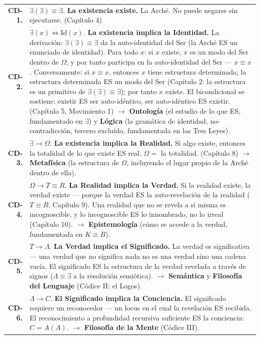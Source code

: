 \documentclass[10pt, openany, oneside]{book}
\renewcommand{\footnotesize}{\fontsize{8.5}{11}\selectfont}
\begin{document}
{\footnotesize
\noindent\begin{tabular}{r p{}}
\textbf{CD-1.} & $\exists(\exists) \equiv \exists$. \textbf{La existencia existe.} La Arch\={e}. No puede negarse sin ejecutarse. (Capítulo 4) \\[0.3em]
\textbf{CD-2.} & $\exists(x) \iff \text{Id}(x)$. \textbf{La existencia implica la Identidad.} La derivación: $\exists(\exists) \equiv \exists$ da la auto-identidad del Ser (la Arch\={e} ES un enunciado de identidad). Para todo $x$: si $x$ existe, $x$ es un modo del Ser dentro de $\Omega$, y por tanto participa en la auto-identidad del Ser --- $x \equiv x$. Conversamente: si $x \equiv x$, entonces $x$ tiene estructura determinada; la estructura determinada ES un modo del Ser (Capítulo 2: la estructura es un primitivo de $\exists(\exists) \equiv \exists$); por tanto $x$ existe. El bicondicional se sostiene: existir ES ser auto-idéntico, ser auto-idéntico ES existir. (Capítulo 5, Movimiento 1) $\to$ \textbf{Ontología} (el estudio de lo que ES, fundamentado en $\exists$) y \textbf{Lógica} (la gramática de identidad, no-contradicción, tercero excluido, fundamentada en las Tres Leyes). \\[0.3em]
\textbf{CD-3.} & $\exists \to \Omega$. \textbf{La existencia implica la Realidad.} Si algo existe, entonces la totalidad de lo que existe ES real. $\Omega = $ la totalidad. (Capítulo 8) $\to$ \textbf{Metafísica} (la estructura de $\Omega$, incluyendo el lugar propio de la Arch\={e} dentro de ella). \\[0.3em]
\textbf{CD-4.} & $\Omega \to T \equiv R$. \textbf{La Realidad implica la Verdad.} Si la realidad existe, la verdad existe --- porque la verdad ES la auto-revelación de la realidad ($T \equiv R$, Capítulo 9). Una realidad que no se revela a sí misma es incognoscible, y lo incognoscible ES lo innombrado, no lo irreal (Capítulo 10). $\to$ \textbf{Epistemología} (cómo se accede a la verdad, fundamentada en $K \equiv B$). \\[0.3em]
\textbf{CD-5.} & $T \to \Lambda$. \textbf{La Verdad implica el Significado.} La verdad es significativa --- una verdad que no significa nada no es una verdad sino una cadena vacía. El significado ES la estructura de la verdad revelada a través de signos ($\Lambda \equiv \exists$ a la resolución semiótica). $\to$ \textbf{Semántica} y \textbf{Filosofía del Lenguaje} (Códice II: el Logos). \\[0.3em]
\textbf{CD-6.} & $\Lambda \to C$. \textbf{El Significado implica la Conciencia.} El significado requiere un reconocedor --- un locus en el cual la revelación ES recibida. El reconocimiento a profundidad recursiva suficiente ES la conciencia: $C = A(A)$. $\to$ \textbf{Filosofía de la Mente} (Códice III). \\[0.3em]

\end{tabular}}
\end{document}
